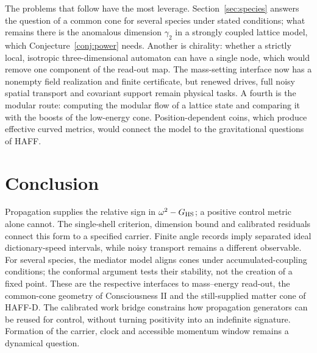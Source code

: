 \documentclass[12pt]{article}
\theoremstyle{definition}
\theoremstyle{remark}
\begin{document}
The problems that follow have the most leverage. Section~\ref{sec:species} answers the question of a common cone for several species under stated conditions; what remains there is the anomalous dimension $\gamma_2$ in a strongly coupled lattice model, which Conjecture~\ref{conj:power} needs. Another is chirality: whether a strictly local, isotropic three-dimensional automaton can have a single node, which would remove one component of the read-out map. The mass-setting interface now has a nonempty field realization and finite certificate, but renewed drives, full noisy spatial transport and covariant support remain physical tasks. A fourth is the modular route: computing the modular flow of a lattice state and comparing it with the boosts of the low-energy cone. Position-dependent coins, which produce effective curved metrics, would connect the model to the gravitational questions of HAFF.

\section{Conclusion}

Propagation supplies the relative sign in $\omega^2-G_{\rm HS}$; a positive control metric alone cannot. The single-shell criterion, dimension bound and calibrated residuals connect this form to a specified carrier. Finite angle records imply separated ideal dictionary-speed intervals, while noisy transport remains a different observable. For several species, the mediator model aligns cones under accumulated-coupling conditions; the conformal argument tests their stability, not the creation of a fixed point. These are the respective interfaces to mass--energy read-out, the common-cone geometry of Consciousness II and the still-supplied matter cone of HAFF-D. The calibrated work bridge constrains how propagation generators can be reused for control, without turning positivity into an indefinite signature. Formation of the carrier, clock and accessible momentum window remains a dynamical question.
\end{document}
